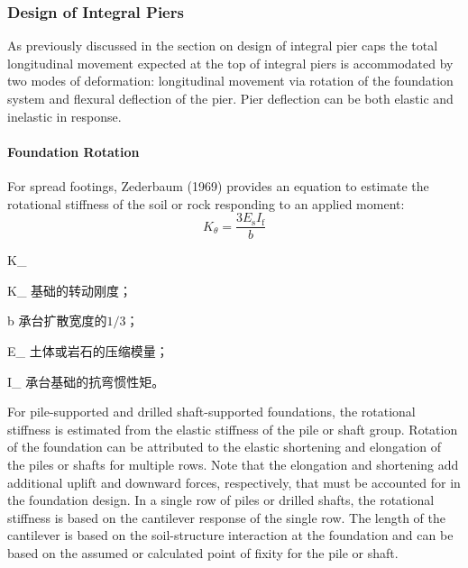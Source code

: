 \subsubsection{Design of Integral Piers}
As previously discussed in the section on design of integral pier caps the total longitudinal movement expected at the top of integral piers is accommodated by two modes of deformation: longitudinal movement via rotation of the foundation system and flexural deflection of the pier. Pier deflection can be both elastic and inelastic in response.

\paragraph{Foundation Rotation}
For spread footings, Zederbaum (1969) provides an equation to estimate the rotational stiffness of the soil or rock responding to an applied moment:
\begin{equation}
  K_\theta=\frac{3E_\text{s}I_\text{f}}{b}
\end{equation}
\begin{EqDesc}{K_\theta}
  \item[K_\theta] 基础的转动刚度；
  \item[b] 承台扩散宽度的$1/3$；
  \item[E_\text{s}] 土体或岩石的压缩模量；
  \item[I_\text{f}] 承台基础的抗弯惯性矩。
\end{EqDesc}

For pile-supported and drilled shaft-supported foundations, the rotational stiffness is estimated from the elastic stiffness of the pile or shaft group. Rotation of the foundation can be attributed to the elastic shortening and elongation of the piles or shafts for multiple rows. Note that the elongation and shortening add additional uplift and downward forces, respectively, that must be accounted for in the foundation design. In a single row of piles or drilled shafts, the rotational stiffness is based on the cantilever response of the single row. The length of the cantilever is based on the soil-structure interaction at the foundation and can be based on the assumed or calculated point of fixity for the pile or shaft.


